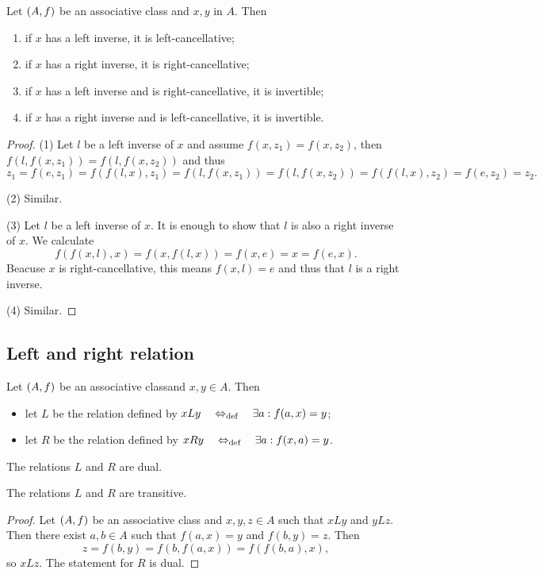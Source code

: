 \begin{lemma}
Let $\left( A, f \right)$ be an associative class and $x,y$ in $A$. Then
\begin{enumerate}
\item if $x$ has a left inverse, it is left-cancellative;
\item if $x$ has a right inverse, it is right-cancellative;
\item if $x$ has a left inverse and is right-cancellative, it is invertible;
\item if $x$ has a right inverse and is left-cancellative, it is invertible.
\end{enumerate}
\end{lemma}
\begin{proof}
(1) Let $l$ be a left inverse of $x$ and assume $f(x, z_1) = f(x,z_2)$, then $f(l, f(x,z_1)) = f(l, f(x,z_2))$ and thus
\[ z_1 = f(e,z_1) = f(f(l,x), z_1) = f(l, f(x,z_1)) = f(l, f(x,z_2)) = f(f(l,x), z_2) = f(e,z_2) = z_2. \]

(2) Similar.

(3) Let $l$ be a left inverse of $x$. It is enough to show that $l$ is also a right inverse of $x$. We calculate
\[ f(f(x,l), x) = f(x, f(l,x)) = f(x, e) = x = f(e,x). \]
Beacuse $x$ is right-cancellative, this means $f(x,l) = e$ and thus that $l$ is a right inverse.

(4) Similar.
\end{proof}


\subsection{Left and right relation}
\begin{definition}
Let $\left( A, f \right)$ be an associative classand $x, y\in A$. Then
\begin{itemize}
\item let $L$ be the relation defined by $xLy \quad\Leftrightarrow_{\text{def}}\quad \exists a: f(a, x) = y$;
\item let $R$ be the relation defined by $xRy \quad\Leftrightarrow_{\text{def}}\quad \exists a: f(x, a) = y$.
\end{itemize}
\end{definition}

The relations $L$ and $R$ are dual.

\begin{lemma}
The relations $L$ and $R$ are transitive.
\end{lemma}
\begin{proof}
Let $\left( A, f \right)$ be an associative class and $x, y, z\in A$ such that $xLy$ and $yLz$. Then there exist $a,b\in A$ such that $f(a,x) = y$ and $f(b,y) = z$. Then
\[ z = f(b,y) = f(b,f(a,x)) = f(f(b,a), x), \]
so $xLz$. The statement for $R$ is dual.
\end{proof}

